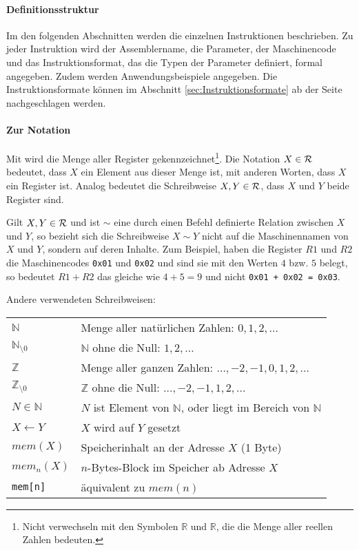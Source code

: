 \paragraph{Definitionsstruktur}
Im den folgenden Abschnitten werden die einzelnen Instruktionen beschrieben. Zu
jeder Instruktion wird der \gls{Assemblername}, die Parameter, der Maschinencode
und das Instruktionsformat, das die Typen der Parameter definiert, formal
angegeben. Zudem werden Anwendungsbeispiele angegeben. Die Instruktionsformate
können im Abschnitt \ref{sec:Instruktionsformate} ab der Seite
\pageref{sec:Instruktionsformate} nachgeschlagen werden.

\paragraph{Zur Notation}
Mit \Reg\index{\Reg} wird die Menge aller Register
gekennzeichnet\footnote{Nicht verwechseln mit den Symbolen $\mathds{R}$ und
$\mathbb{R}$, die die Menge aller reellen Zahlen bedeuten.}.
Die Notation $X \in \mathcal{R}$ bedeutet, dass $X$ ein Element aus dieser Menge ist,
mit anderen Worten, dass $X$ ein Register ist. Analog bedeutet die
Schreibweise $X,Y \in \mathcal{R}$, dass $X$ und $Y$ beide Register sind.

Gilt $X, Y\in \mathcal{R}$ und ist $\sim$ eine durch einen Befehl definierte Relation
zwischen $X$ und $Y$, so bezieht sich die Schreibweise $X \sim Y$ nicht auf die
Maschinennamen von $X$ und $Y$, sondern auf deren Inhalte. Zum Beispiel, haben
die Register $R1$ und $R2$ die Maschinencodes \texttt{0x01} und \texttt{0x02}
und sind sie mit den Werten $4$ bzw. $5$ belegt, so bedeutet $R1 + R2$ das
gleiche wie $4 + 5 = 9$ und nicht \texttt{0x01 + 0x02 = 0x03}.

Andere verwendeten Schreibweisen:
\begin{center}
\begin{tabular}{l|l}\toprule
 $\mathds{N}$ & Menge aller natürlichen Zahlen: $0,1,2,\ldots$         \\
 $\mathds{N}_{\setminus 0}$ 
              & $\mathds{N}$ ohne die Null: $1,2,\ldots$               \\
 $\mathds{Z}$ & Menge aller ganzen Zahlen: $\ldots,-2,-1,0,1,2,\ldots$ \\
 $\mathds{Z}_{\setminus 0}$ 
              & $\mathds{Z}$ ohne die Null: $\ldots,-2,-1,1,2,\ldots$  \\
 $N \in \mathds{N}$
              & $N$ ist Element von $\mathds{N}$, oder liegt im Bereich von
              $\mathds{N}$                                             \\
 $X \gets Y$  & $X$ wird auf $Y$ gesetzt                               \\
 $mem(X)$     & Speicherinhalt an der Adresse $X$ (1 Byte)             \\
 $mem_{n}(X)$ & $n$-Bytes-Block im Speicher ab Adresse $X$             \\
 \texttt{mem[n]}
              & äquivalent zu $mem(n)$                                 \\
\bottomrule
\end{tabular}
\end{center} 
